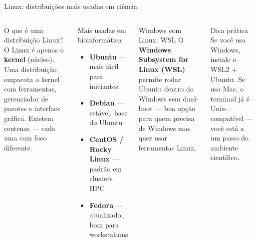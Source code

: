 \begin{frame}[shrink=10]{Linux: distribuições mais usadas em ciência}
\begin{columns}
\begin{block}{O que é uma distribuição Linux?}
O Linux é apenas o \textbf{kernel} (núcleo). Uma distribuição empacota o kernel com ferramentas, gerenciador de pacotes e interface gráfica. Existem centenas — cada uma com foco diferente.
\end{block}

\vspace{0.4cm}
\begin{exampleblock}{Mais usadas em bioinformática}
\begin{itemize}
    \item \textbf{Ubuntu} — mais fácil para iniciantes
    \item \textbf{Debian} — estável, base do Ubuntu
    \item \textbf{CentOS / Rocky Linux} — padrão em clusters HPC
    \item \textbf{Fedora} — atualizado, bom para workstations
\end{itemize}
\end{exampleblock}

\begin{block}{Windows com Linux: WSL}
O \textbf{Windows Subsystem for Linux (WSL)} permite rodar Ubuntu dentro do Windows sem dual-boot — boa opção para quem precisa de Windows mas quer usar ferramentas Linux.
\end{block}

\vspace{0.4cm}
\begin{alertblock}{Dica prática}
Se você usa Windows, instale o WSL2 + Ubuntu. Se usa Mac, o terminal já é Unix-compatível — você está a um passo do ambiente científico.
\end{alertblock}
\end{columns}
\end{frame}

